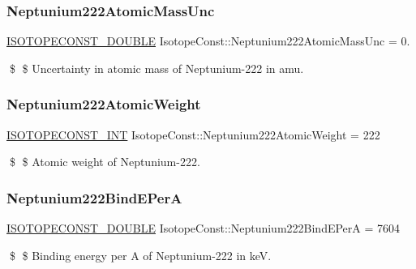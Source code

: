 \subsubsection{\texorpdfstring{Neptunium222\+Atomic\+Mass\+Unc}{Neptunium222AtomicMassUnc}}
{\footnotesize\ttfamily \mbox{\hyperlink{group___isotope_const-_macros_ga8f45a7272ce02c0b4c65c44636ed719a}{I\+S\+O\+T\+O\+P\+E\+C\+O\+N\+S\+T\+\_\+\+D\+O\+U\+B\+LE}} Isotope\+Const\+::\+Neptunium222\+Atomic\+Mass\+Unc = 0.}

\$ \$ Uncertainty in atomic mass of Neptunium-\/222 in amu. \mbox{\label{group___isotope_const-_neptunium-_np222_ga2ff3f43f79df6ee66dc18fd7f9e79426}} 
\subsubsection{\texorpdfstring{Neptunium222\+Atomic\+Weight}{Neptunium222AtomicWeight}}
{\footnotesize\ttfamily \mbox{\hyperlink{group___isotope_const-_macros_ga5f18360b3e99483a35c32d789e62621c}{I\+S\+O\+T\+O\+P\+E\+C\+O\+N\+S\+T\+\_\+\+I\+NT}} Isotope\+Const\+::\+Neptunium222\+Atomic\+Weight = 222}

\$ \$ Atomic weight of Neptunium-\/222. \mbox{\label{group___isotope_const-_neptunium-_np222_gaa85ab7c7398ceee386285c4adeb747b1}} 
\subsubsection{\texorpdfstring{Neptunium222\+Bind\+E\+PerA}{Neptunium222BindEPerA}}
{\footnotesize\ttfamily \mbox{\hyperlink{group___isotope_const-_macros_ga8f45a7272ce02c0b4c65c44636ed719a}{I\+S\+O\+T\+O\+P\+E\+C\+O\+N\+S\+T\+\_\+\+D\+O\+U\+B\+LE}} Isotope\+Const\+::\+Neptunium222\+Bind\+E\+PerA = 7604}

\$ \$ Binding energy per A of Neptunium-\/222 in keV. \mbox{\label{group___isotope_const-_neptunium-_np222_gadfc532d2156185ed6cc3beb6911a20ee}} 
